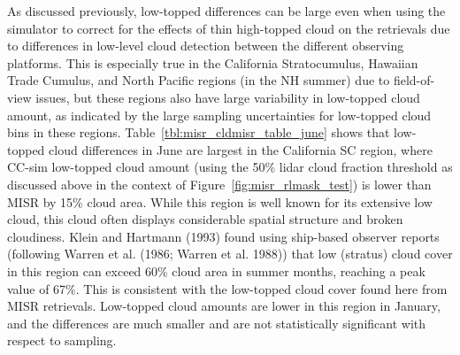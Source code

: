 As discussed previously, low-topped differences can be large even when
using the simulator to correct for the effects of thin high-topped cloud
on the retrievals due to differences in low-level cloud detection
between the different observing platforms. This is especially true in
the California Stratocumulus, Hawaiian Trade Cumulus, and North Pacific
regions (in the NH summer) due to field-of-view issues, but these
regions also have large variability in low-topped cloud amount, as
indicated by the large sampling uncertainties for low-topped cloud bins
in these regions. Table~\ref{tbl:misr_cldmisr_table_june} shows that
low-topped cloud differences in June are largest in the California SC
region, where CC-sim low-topped cloud amount (using the 50\% lidar cloud
fraction threshold as discussed above in the context of
Figure~\ref{fig:misr_rlmask_test}) is lower than MISR by 15\% cloud
area. While this region is well known for its extensive low cloud, this
cloud often displays considerable spatial structure and broken
cloudiness. Klein and Hartmann (1993) found using ship-based observer
reports (following Warren et al. (1986; Warren et al. 1988)) that low
(stratus) cloud cover in this region can exceed 60\% cloud area in
summer months, reaching a peak value of 67\%. This is consistent with
the low-topped cloud cover found here from MISR retrievals. Low-topped
cloud amounts are lower in this region in January, and the differences
are much smaller and are not statistically significant with respect to
sampling.

